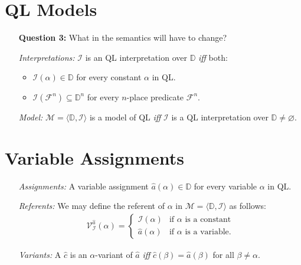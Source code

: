 \documentclass[a4paper, 11pt]{article} %
\newcommand{\tuple}[1]{\langle#1\rangle} %
\newcommand{\I}{\mathcal{I}}
\newcommand{\F}{\mathcal{F}}
\newcommand{\M}{\mathcal{M}}
\newcommand{\D}{\mathbb{D}}
\newcommand{\VV}[2]{\mathcal{V}_{#1}^{#2}} %
\begin{document}
\section*{QL Models}

\begin{enumerate}
  \item[\bf Question 3:] What in the semantics will have to change?
  \item[\it Interpretations:] $\I$ is an QL interpretation over $\D$ \textit{iff} both: 
    \begin{itemize}
      \item $\I(\alpha)\in\D$ for every constant $\alpha$ in QL. 
      \item $\I(\F^n)\subseteq\D^n$ for every $n$-place predicate $\F^n$.
    \end{itemize}
  \item[\it Model:] $\M=\tuple{\D,\I}$ is a model of QL \textit{iff} $\I$ is a QL interpretation over $\D\neq\varnothing$.
\end{enumerate}





\section*{Variable Assignments}

\begin{enumerate}
  \item[\it Assignments:] A variable assignment $\hat{a}(\alpha)\in\D$ for every variable $\alpha$ in QL.
  \item[\it Referents:] We may define the referent of $\alpha$ in $\M=\tuple{\D,\I}$ as follows:\\
    \begin{align*}
      \VV{\I}{\hat{a}}{(\alpha)}=
        \begin{cases}
          \I(\alpha) & \text{if } \alpha \text{ is a constant} \\
          \hat{a}(\alpha) & \text{if } \alpha \text{ is a variable.}
        \end{cases}
    \end{align*}
  \item[\it Variants:] A $\hat{c}$ is an $\alpha$-variant of $\hat{a}$ \textit{iff} $\hat{c}(\beta)=\hat{a}(\beta)$ for all $\beta\neq\alpha$.
\end{enumerate}
\end{document}
